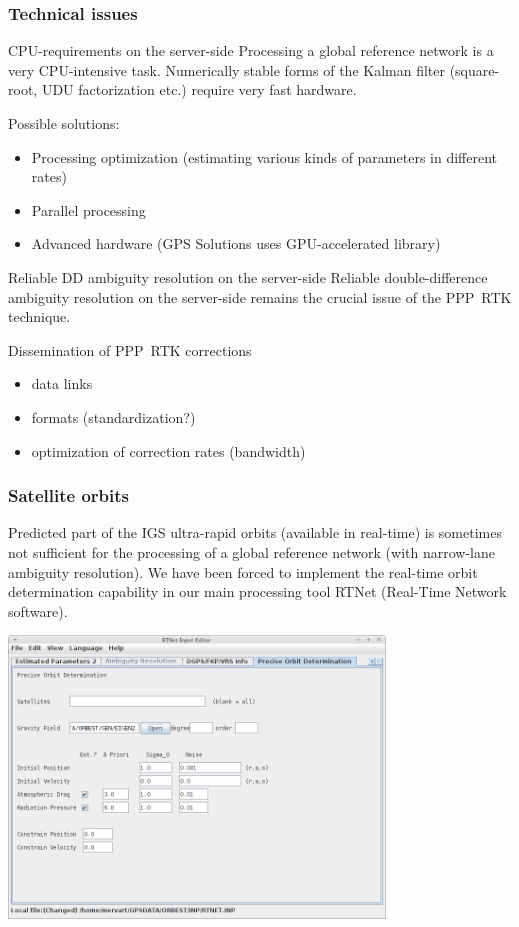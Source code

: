 \documentclass[10pt]{beamer}
\begin{document}
\begin{frame}
  \frametitle{Technical issues}
  \begin{block}{CPU-requirements on the server-side}
  Processing a global reference network is a very CPU-intensive
  task. Numerically stable forms of the Kalman filter (square-root, UDU
  factorization etc.) require very fast hardware. 

  Possible solutions:
  \begin{itemize}
  \item Processing optimization (estimating various kinds of parameters in 
        different rates)
  \item Parallel processing 
  \item Advanced hardware (GPS Solutions uses GPU-accelerated library)
  \end{itemize}
  \end{block}
  \begin{block}{Reliable DD ambiguity resolution on the server-side}
  Reliable double-difference ambiguity resolution on the server-side remains
  the crucial issue of the PPP~RTK technique.
  \end{block}
  \begin{block}{Dissemination of PPP~RTK corrections}
  \begin{itemize}
  \item data links
  \item formats (standardization?)
  \item optimization of correction rates (bandwidth)
  \end{itemize}
  \end{block}
\end{frame}


\begin{frame}
  \frametitle{Satellite orbits}

  Predicted part of the IGS ultra-rapid orbits (available in real-time) is
  sometimes not sufficient for the processing of a global reference network
  (with narrow-lane ambiguity resolution). We have been forced to implement
  the real-time orbit determination capability in our main processing tool
  RTNet (Real-Time Network software).
  \begin{center}
    \includegraphics[width=0.75\textwidth]{rtnet_pod.png}
  \end{center}
\end{frame}
\end{document}
